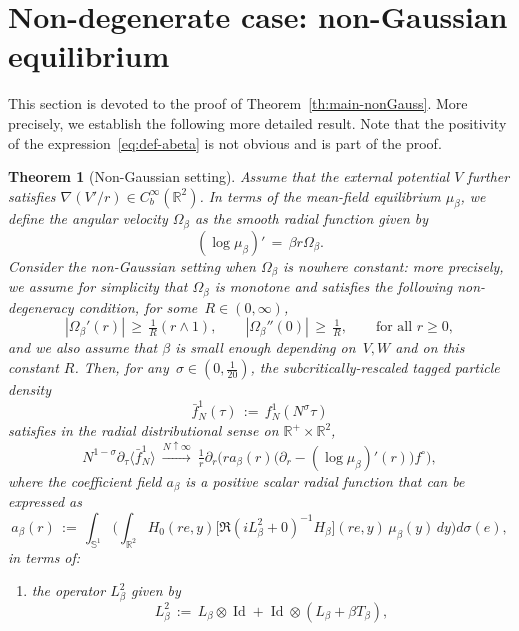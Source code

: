 \documentclass[a4paper,11pt,reqno,noindent]{amsart}
\theoremstyle{plain}
\newtheorem{theor}[lem]{Theorem}
\numberwithin{equation}{section}
\newcommand{\R}{\mathbb R}
\newcommand{\Sp}{\mathbb S}
\newcommand{\Id}{\operatorname{Id}}
\newcommand{\3}{|\!|\!|}
\begin{document}
\section{Non-degenerate case: non-Gaussian equilibrium}\label{sec:non-Gauss}

This section is devoted to the proof of Theorem~\ref{th:main-nonGauss}. More precisely, we establish the following more detailed result. Note that the positivity of the expression~\eqref{eq:def-abeta} is not obvious and is part of the proof.

\begin{theor}[Non-Gaussian setting]\label{th:main-nonGauss-re}
Assume that the external potential $V$ further satisfies $\nabla(V'/r)\in C^\infty_b(\R^2)$.
In terms of the mean-field equilibrium $\mu_\beta$, we define the angular velocity $\Omega_\beta$ as the smooth radial function given by
\[(\log\mu_\beta)'\,=\,\beta r\Omega_\beta.\]
Consider the non-Gaussian setting when $\Omega_\beta$ is nowhere constant:
more precisely, we assume for simplicity that $\Omega_\beta$ is monotone and satisfies the following non-degeneracy condition, for some~{$R\in(0,\infty)$},
\begin{equation}\label{eq:nondegenerate}
|\Omega_\beta'(r)|\,\ge\,\tfrac1R(r\wedge1),\qquad|\Omega_\beta''(0)|\,\ge\,\tfrac1R,
\qquad\text{for all $r\ge0$},
\end{equation}
and we also assume that $\beta$ is small enough depending on~$V,W$ and on this constant $R$.
Then, for any~\mbox{$\sigma\in(0,\frac1{20})$}, the subcritically-rescaled tagged particle density
\[\bar f_N^1(\tau)\,:=\,f_N^1(N^\sigma\tau)\]
satisfies in the radial distributional sense on $\R^+\times\R^2$,
\begin{equation}\label{eq:FP-noGauss}
N^{1-\sigma}\partial_\tau\langle\bar f_N^1\rangle~\xrightarrow{N\uparrow\infty}~\tfrac1r\partial_r \Big(ra_\beta(r)\big(\partial_r-(\log\mu_\beta)'(r) \big)f^\circ\Big),
\end{equation}
where the coefficient field $a_\beta$ is a positive scalar radial function that can be expressed as
\begin{equation}\label{eq:def-abeta}
a_\beta(r)\,:=\,\int_{\Sp^1}\bigg(\int_{\R^2}H_0(re,y)\big[\Re(iL_\beta^2+0)^{-1}H_\beta\big]\!(re,y)\,\mu_\beta(y)\,dy\bigg)d\sigma(e),
\end{equation}
in terms of:
\begin{enumerate}[$\bullet$]
\item the operator $L_\beta^2$ given by
\[L_\beta^2\,:=\,L_\beta\otimes\Id+\Id\otimes(L_\beta+\beta T_\beta),\]

\end{enumerate}
\end{theor}
\end{document}
